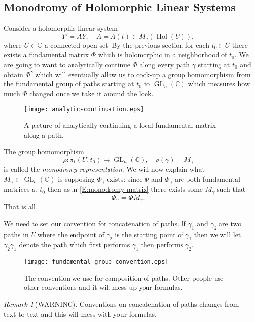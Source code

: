 \documentclass[12pt]{book}
\numberwithin{equation}{section}
\theoremstyle{definition}
\theoremstyle{remark}
\newtheorem{remark}[theorem]{Remark}
\newcommand{\CC}{\mathbb{C}}
\newcommand{\hol}{\operatorname{Hol}}
\newcommand{\GL}{\operatorname{GL}}
\begin{document}
\subsection{Monodromy of Holomorphic Linear Systems}

Consider a holomorphic linear system 
$$Y'=AY, \quad A=A(t) \in M_n(\hol(U)),$$ 
where $U\subset \CC$ a connected open set. 
By the previous section for each $t_0 \in U$ there exists a fundamental matrix $\Phi$ which is holomorphic in a neighborhood of $t_0$.
We are going to want to analytically continue $\Phi$ along every path $\gamma$ starting at $t_0$ and obtain $\Phi^{\gamma}$ which will eventually allow us to cook-up a group homomorphism from the fundamental group of paths starting at $t_0$ to $\GL_n(\CC)$ which measures how much $\Phi$ changed once we take it around the look. 

\begin{figure}[h]
	\begin{center}
	\texttt{[image: analytic-continuation.eps]}
	\end{center}
\caption{A picture of analytically continuing a local fundamental matrix along a path.}
\end{figure}

The group homomorphism 
 $$ \rho: \pi_1(U,t_0) \to \GL_n(\CC), \quad \rho(\gamma) = M_{\gamma}$$
is called the \emph{monodromy representation}.
We will now explain what $M_{\gamma}\in \GL_n(\CC)$ is  supposing $\Phi_{\gamma}$ exists:
since $\Phi$ and $\Phi_{\gamma}$ are both fundamental matrices at $t_0$ then as in  \eqref{E:monodromy-matrix} there exists some $M_{\gamma}$ such that 
 $$ \Phi_{\gamma} = \Phi M_{\gamma}.$$
That is all.

We need to set our convention for concatenation of paths. 
If $\gamma_1$ and $\gamma_2$ are two paths in $U$ where the endpoint of $\gamma_2$ is the starting point of $\gamma_1$ then we will let $\gamma_2\gamma_1$ denote the path which first performs $\gamma_1$ then performs $\gamma_2$. 

\begin{figure}[h]
\begin{center}
\texttt{[image: fundamental-group-convention.eps]}\label{F:fundamental-group-convention}
\end{center}
\caption{The convention we use for composition of paths. Other people use other conventions and it will mess up your formulas.}
\end{figure}

\begin{remark}[WARNING]
	Conventions on concatenation of paths changes from text to text and this will mess with your formulas.
\end{remark}
\end{document}
